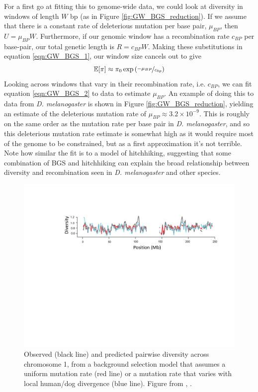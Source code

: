 For a first go at fitting this to genome-wide data, we could look at
diversity in windows of length $W$ bp (as in Figure \ref{fig:GW_BGS_reduction}). If we assume that there is a constant rate of
deleterious mutation per base pair, $\mu_{BP}$, then $U=\mu_{BP}W$. Furthermore, if our genomic window has a
recombination rate $c_{BP}$ per base-pair, our total genetic length is
$R=c_{BP}W$. Making these substitutions in equation \eqref{eqn:GW_BGS_1}, our window size cancels out to give
\begin{equation}
  \mathbb{E}[\pi] \approx \pi_0 \exp \left(\nicefrac{-\mu_{BP}}{c_{bp}}
  \right) \label{eqn:GW_BGS_2}
 \end{equation}
Looking across windows that vary in their recombination rate,
i.e. $c_{BP}$, we can fit equation \eqref{eqn:GW_BGS_2} to data to
estimate $\mu_{BP}$. An example of doing this to data from {\it D. melanogaster}
  is shown in Figure
\ref{fig:GW_BGS_reduction}, yielding an estimate of the deleterious
mutation rate of $\mu_{BP}\approx
3.2 \times 10^{-9}$. This is roughly on the same order as the mutation
rate per base pair in  {\it D. melanogaster}, and so this deleterious mutation rate estimate is somewhat high as it
would require most of the genome to be constrained, but as a first
approximation it's not terrible. Note how similar the fit is to a model of
hitchhiking, suggesting that some combination of BGS and hitchhiking can explain the
broad relationship between diversity and recombination seen in {\it D. melanogaster} and other species.


\begin{figure}
\begin{center}
\includegraphics[width=\textwidth]{Journal_figs/recom_selection/McVicker_human_BGS/McVicker_human_BGS.pdf}
\end{center}
\caption{Observed (black line) and predicted pairwise diversity across
  chromosome 1, from a background selection model that assumes a
  uniform mutation rate (red line) or a mutation rate that varies with
  local human/dog divergence (blue line). Figure from
  \citep{Mcvicker:09}, \PLOSccBY. } \label{fig:McVicker_BGS}
\end{figure}

